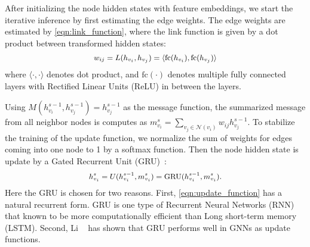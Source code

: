 \documentclass[10pt,twocolumn,letterpaper]{article}
\begin{document}
After initializing the node hidden states with feature embeddings, we start the iterative inference by first estimating the edge weights. The edge weights are estimated by \autoref{eqn:link_function}, where the link function is given by a dot product between transformed hidden states:
    \vspace{-4pt}
\begin{equation}\small
\begin{aligned}
w_{ij} = L(h_{v_i}, h_{v_j}) = \langle \text{fc}(h_{v_i}), \text{fc}(h_{v_j}) \rangle
\end{aligned}
\label{eqn:link_function_detail}
\vspace{-4pt}
\end{equation}
where $\langle \cdot,\cdot \rangle$ denotes dot product, and $\text{fc}(\cdot)$ denotes multiple fully connected layers with Rectified Linear Units (ReLU) in between the layers.

Using $M(h_{v_{i}}^{s-1}, h_{v_{j}}^{s-1}) = h_{v_{j}}^{s-1}$ as the message function, the summarized message from all neighbor nodes is computes as $m_{v_{i}}^{s} = \sum\nolimits_{v_{j} \in \mathcal{N}(v_{i})} w_{ij} h_{v_{j}}^{s-1}$. To stabilize the training of the update function, we normalize the sum of weights for edges coming into one node to 1 by a softmax function. Then the node hidden state is update by a Gated Recurrent Unit (GRU)~\cite{cho2014learning}:
\vspace{-4pt}
\begin{equation}\small
\begin{aligned}
h_{v_{i}}^{s} = U(h_{v_{i}}^{s-1}, m_{v_{i}}^{s}) = \text{GRU}(h_{v_{i}}^{s-1}, m_{v_{i}}^{s}).
\end{aligned}
\label{eqn:update_function}
\vspace{-4pt}
\end{equation}
Here the GRU is chosen for two reasons. First, \autoref{eqn:update_function} has a natural recurrent form. GRU is one type of Recurrent Neural Networks (RNN) that known to be more computationally efficient than Long short-term memory (LSTM). Second, Li \etal~\cite{li2016gated} has shown that GRU performs well in GNNs as update functions.
\end{document}
